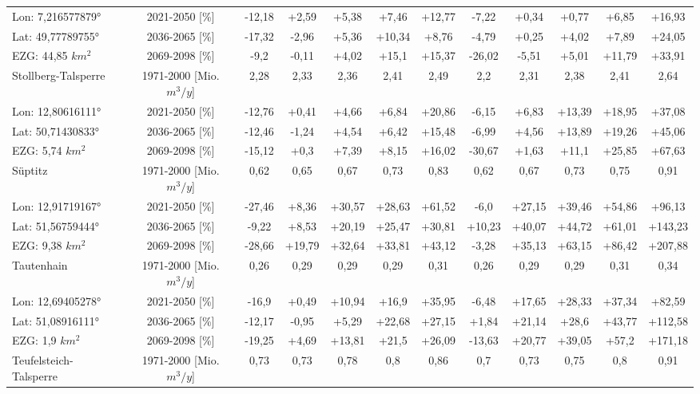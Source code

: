 \begin{longtable}{@{\extracolsep{\fill}}lc|ccccc||ccccc}
\cline{2-12} 
Lon: 7,216577879° & 2021-2050 [\%]  & -12,18 & +2,59 & +5,38 & +7,46 & +12,77 & -7,22 & +0,34 & +0,77 & +6,85 & +16,93\\ 
Lat: 49,77789755° & 2036-2065 [\%]  & -17,32 & -2,96 & +5,36 & +10,34 & +8,76 & -4,79 & +0,25 & +4,02 & +7,89 & +24,05\\ 
EZG: 44,85 $km^2$ & 2069-2098 [\%]  & -9,2 & -0,11 & +4,02 & +15,1 & +15,37 & -26,02 & -5,51 & +5,01 & +11,79 & +33,91\\ 
\hline 
Stollberg-Talsperre & 1971-2000 [Mio. $m^3/y$]  & 2,28 & 2,33 & 2,36 & 2,41 & 2,49 & 2,2 & 2,31 & 2,38 & 2,41 & 2,64\\ 
\cline{2-12} 
Lon: 12,80616111° & 2021-2050 [\%]  & -12,76 & +0,41 & +4,66 & +6,84 & +20,86 & -6,15 & +6,83 & +13,39 & +18,95 & +37,08\\ 
Lat: 50,71430833° & 2036-2065 [\%]  & -12,46 & -1,24 & +4,54 & +6,42 & +15,48 & -6,99 & +4,56 & +13,89 & +19,26 & +45,06\\ 
EZG: 5,74 $km^2$ & 2069-2098 [\%]  & -15,12 & +0,3 & +7,39 & +8,15 & +16,02 & -30,67 & +1,63 & +11,1 & +25,85 & +67,63\\ 
\hline 
Süptitz & 1971-2000 [Mio. $m^3/y$]  & 0,62 & 0,65 & 0,67 & 0,73 & 0,83 & 0,62 & 0,67 & 0,73 & 0,75 & 0,91\\ 
\cline{2-12} 
Lon: 12,91719167° & 2021-2050 [\%]  & -27,46 & +8,36 & +30,57 & +28,63 & +61,52 & -6,0 & +27,15 & +39,46 & +54,86 & +96,13\\ 
Lat: 51,56759444° & 2036-2065 [\%]  & -9,22 & +8,53 & +20,19 & +25,47 & +30,81 & +10,23 & +40,07 & +44,72 & +61,01 & +143,23\\ 
EZG: 9,38 $km^2$ & 2069-2098 [\%]  & -28,66 & +19,79 & +32,64 & +33,81 & +43,12 & -3,28 & +35,13 & +63,15 & +86,42 & +207,88\\ 
\hline 
Tautenhain & 1971-2000 [Mio. $m^3/y$]  & 0,26 & 0,29 & 0,29 & 0,29 & 0,31 & 0,26 & 0,29 & 0,29 & 0,31 & 0,34\\ 
\cline{2-12} 
Lon: 12,69405278° & 2021-2050 [\%]  & -16,9 & +0,49 & +10,94 & +16,9 & +35,95 & -6,48 & +17,65 & +28,33 & +37,34 & +82,59\\ 
Lat: 51,08916111° & 2036-2065 [\%]  & -12,17 & -0,95 & +5,29 & +22,68 & +27,15 & +1,84 & +21,14 & +28,6 & +43,77 & +112,58\\ 
EZG: 1,9 $km^2$ & 2069-2098 [\%]  & -19,25 & +4,69 & +13,81 & +21,5 & +26,09 & -13,63 & +20,77 & +39,05 & +57,2 & +171,18\\ 
\hline 
Teufelsteich-Talsperre & 1971-2000 [Mio. $m^3/y$]  & 0,73 & 0,73 & 0,78 & 0,8 & 0,86 & 0,7 & 0,73 & 0,75 & 0,8 & 0,91\\ 

\end{longtable}
